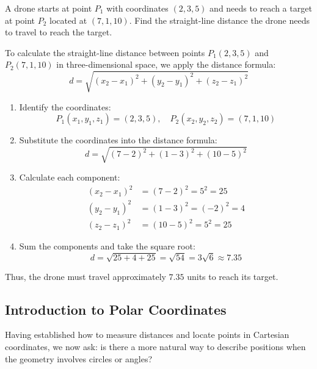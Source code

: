 \exampleline
\begin{example}
A drone starts at point \( P_1 \) with coordinates \( (2, 3, 5) \) and needs to reach a target at point \( P_2 \) located at \( (7, 1, 10) \). Find the straight-line distance the drone needs to travel to reach the target.

\begin{solution}
To calculate the straight-line distance between points \( P_1(2, 3, 5) \) and \( P_2(7, 1, 10) \) in three-dimensional space, we apply the distance formula:
\[
d = \sqrt{(x_2 - x_1)^2 + (y_2 - y_1)^2 + (z_2 - z_1)^2}
\]

\begin{enumerate}
    \item Identify the coordinates:
    \[
    P_1(x_1, y_1, z_1) = (2, 3, 5), \quad P_2(x_2, y_2, z_2) = (7, 1, 10)
    \]

    \item Substitute the coordinates into the distance formula:
    \[
    d = \sqrt{(7 - 2)^2 + (1 - 3)^2 + (10 - 5)^2}
    \]

    \item Calculate each component:
    \begin{align*}
    (x_2 - x_1)^2 &= (7 - 2)^2 = 5^2 = 25 \\
    (y_2 - y_1)^2 &= (1 - 3)^2 = (-2)^2 = 4 \\
    (z_2 - z_1)^2 &= (10 - 5)^2 = 5^2 = 25
    \end{align*}

    \item Sum the components and take the square root:
    \[
    d = \sqrt{25 + 4 + 25} = \sqrt{54} = 3\sqrt{6} \approx 7.35
    \]

\end{enumerate}

Thus, the drone must travel approximately \( 7.35 \) units to reach its target.

\end{solution}
\end{example}
\exampleline



\subsection*{Introduction to Polar Coordinates}  

Having established how to measure distances and locate points in Cartesian coordinates, we now ask: is there a more natural way to describe positions when the geometry involves circles or angles?

